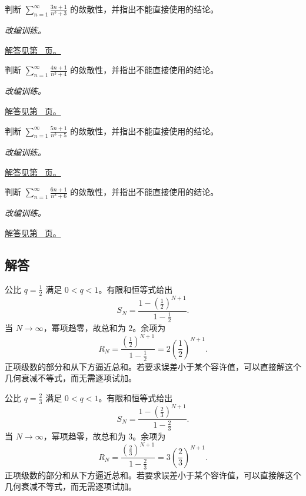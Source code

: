 \documentclass[UTF8,12pt,a4paper,fontset=fandol]{ctexart}
\begin{document}
\begin{example}[极限比较与主导次数]\label{ex:c24q21}
判断 $\displaystyle\sum_{n=1}^\infty\frac{3n+1}{n^3+3}$ 的敛散性，并指出不能直接使用的结论。
\par\textit{改编训练。}\par\hyperref[ans:c24q21]{解答见第~\pageref{ans:c24q21} 页。}
\end{example}
\begin{example}[极限比较与主导次数]\label{ex:c24q22}
判断 $\displaystyle\sum_{n=1}^\infty\frac{4n+1}{n^3+4}$ 的敛散性，并指出不能直接使用的结论。
\par\textit{改编训练。}\par\hyperref[ans:c24q22]{解答见第~\pageref{ans:c24q22} 页。}
\end{example}
\begin{example}[极限比较与主导次数]\label{ex:c24q23}
判断 $\displaystyle\sum_{n=1}^\infty\frac{5n+1}{n^3+5}$ 的敛散性，并指出不能直接使用的结论。
\par\textit{改编训练。}\par\hyperref[ans:c24q23]{解答见第~\pageref{ans:c24q23} 页。}
\end{example}
\begin{example}[极限比较与主导次数]\label{ex:c24q24}
判断 $\displaystyle\sum_{n=1}^\infty\frac{6n+1}{n^3+6}$ 的敛散性，并指出不能直接使用的结论。
\par\textit{改编训练。}\par\hyperref[ans:c24q24]{解答见第~\pageref{ans:c24q24} 页。}
\end{example}
\subsection{解答}
\begin{solve}\label{ans:c24q1}
公比 $q=\frac{1}{2}$ 满足 $0<q<1$。有限和恒等式给出
\[
S_N=\frac{1-(\frac{1}{2})^{N+1}}{1-\frac{1}{2}}.
\]
当 $N\to\infty$，幂项趋零，故总和为 $2$。余项为
\[
R_N=\frac{(\frac{1}{2})^{N+1}}{1-\frac{1}{2}}=2(\frac{1}{2})^{N+1}.
\]
正项级数的部分和从下方逼近总和。若要求误差小于某个容许值，可以直接解这个几何衰减不等式，而无需逐项试加。
\end{solve}

\begin{solve}\label{ans:c24q2}
公比 $q=\frac{2}{3}$ 满足 $0<q<1$。有限和恒等式给出
\[
S_N=\frac{1-(\frac{2}{3})^{N+1}}{1-\frac{2}{3}}.
\]
当 $N\to\infty$，幂项趋零，故总和为 $3$。余项为
\[
R_N=\frac{(\frac{2}{3})^{N+1}}{1-\frac{2}{3}}=3(\frac{2}{3})^{N+1}.
\]
正项级数的部分和从下方逼近总和。若要求误差小于某个容许值，可以直接解这个几何衰减不等式，而无需逐项试加。
\end{solve}
\end{document}
